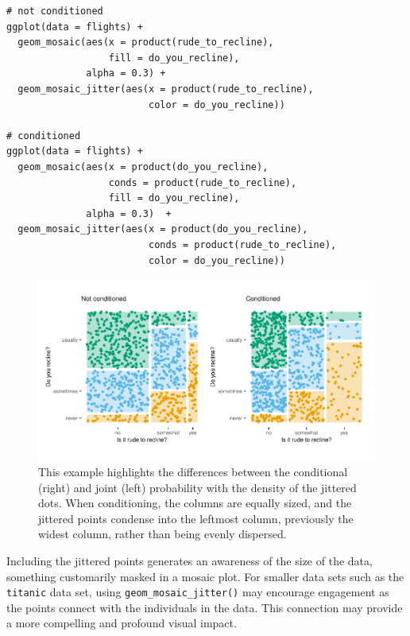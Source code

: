 \begin{verbatim}
# not conditioned
ggplot(data = flights) +
  geom_mosaic(aes(x = product(rude_to_recline), 
                  fill = do_you_recline), 
              alpha = 0.3) +
  geom_mosaic_jitter(aes(x = product(rude_to_recline), 
                         color = do_you_recline))
  
# conditioned
ggplot(data = flights) +
  geom_mosaic(aes(x = product(do_you_recline), 
                  conds = product(rude_to_recline), 
                  fill = do_you_recline), 
              alpha = 0.3)  +
  geom_mosaic_jitter(aes(x = product(do_you_recline), 
                         conds = product(rude_to_recline), 
                         color = do_you_recline))
\end{verbatim}

\begin{figure}[h]

{\centering \includegraphics[width=1\linewidth]{jeppson-hofmann_files/figure-latex/jitter-1} 

}

\caption{This example highlights the differences between the conditional (right) and joint (left) probability with the density of the jittered dots. When conditioning, the columns are equally sized, and the jittered points condense into the leftmost column, previously the widest column, rather than being evenly dispersed.}\label{fig:jitter}
\end{figure}

Including the jittered points generates an awareness of the size of the data, something customarily masked in a mosaic plot. For smaller data sets such as the \texttt{titanic} data set, using \texttt{geom\_mosaic\_jitter()} may encourage engagement as the points connect with the individuals in the data. This connection may provide a more compelling and profound visual impact.

